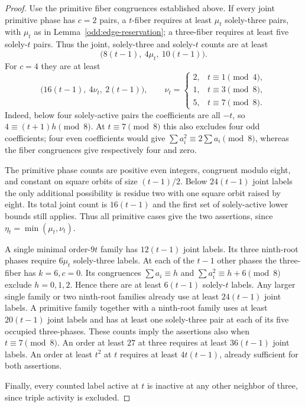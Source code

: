 \documentclass[11pt]{amsart}
\numberwithin{equation}{section}
\theoremstyle{definition}
\theoremstyle{plain}
\begin{document}
\begin{proof}
Use the primitive fiber congruences established above. If every
joint primitive phase has $c=2$ pairs, a $t$-fiber requires at least
$\mu_t$ solely-three pairs, with $\mu_t$ as in
Lemma~\ref{odd:edge-reservation}; a three-fiber requires at least
five solely-$t$ pairs. Thus the joint, solely-three and solely-$t$
counts are at least
\[
       \bigl(8(t-1),\ 4\mu_t,\ 10(t-1)\bigr).
\]
For $c=4$ they are at least
\[
       \bigl(16(t-1),\ 4\nu_t,\ 2(t-1)\bigr),
 \qquad
 \nu_t=\begin{cases}
 2,&t\equiv1\pmod4,\\
 1,&t\equiv3\pmod8,\\
 5,&t\equiv7\pmod8.
 \end{cases}
\]
Indeed, below four solely-active pairs the coefficients are all
$-t$, so $4\equiv(t+1)h\pmod8$. At $t\equiv7\pmod8$ this
also excludes four odd coefficients; four even coefficients would
give $\sum a_i^2\equiv2\sum a_i\pmod8$, whereas the fiber
congruences give respectively four and zero.

The primitive phase counts are positive even integers, congruent
modulo eight, and constant on square orbits of size $(t-1)/2$.
Below $24(t-1)$ joint labels the only additional possibility is
residue two with one square orbit raised by eight. Its total joint
count is $16(t-1)$ and the first set of solely-active lower bounds
still applies. Thus all primitive cases give the two assertions,
since $\eta_t=\min(\mu_t,\nu_t)$.

A single minimal order-$9t$ family has $12(t-1)$ joint labels.
Its three ninth-root phases require $6\mu_t$ solely-three labels.
At each of the $t-1$ other phases the three-fiber has $k=6,c=0$.
Its congruences $\sum a_i\equiv h$ and
$\sum a_i^2\equiv h+6\pmod8$ exclude $h=0,1,2$.
Hence there are at least $6(t-1)$ solely-$t$ labels. Any larger
single family or two ninth-root families already use at least
$24(t-1)$ joint labels. A primitive family together with a ninth-root
family uses at least $20(t-1)$ joint labels and has at least one
solely-three pair at each of its five occupied three-phases.
These counts imply the assertions also when $t\equiv7\pmod8$.
An order at least $27$ at three requires at least $36(t-1)$ joint
labels. An order at least $t^2$ at $t$ requires at least
$4t(t-1)$, already sufficient for both assertions.

Finally, every counted label active at $t$ is inactive at any
other neighbor of three, since triple activity is excluded.
\end{proof}
\end{document}
